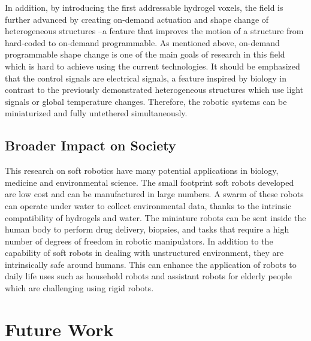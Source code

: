 In addition, by introducing the first addressable hydrogel voxels,  the field is further advanced by creating on-demand actuation and shape change of heterogeneous structures --a feature that improves the motion of a structure from hard-coded to on-demand programmable. As mentioned above, on-demand programmable shape change is one of the main goals of research in this field which is hard to achieve using the current technologies. It should be emphasized that the control signals are electrical signals, a feature inspired by biology in contrast to the previously demonstrated heterogeneous structures which use light signals or global temperature changes. Therefore, the robotic systems can be miniaturized and fully untethered simultaneously.
\subsection{Broader Impact on Society}
This research on soft robotics have many potential applications in biology, medicine and environmental science. The small footprint soft robots developed are low cost and can be manufactured in large numbers. A swarm of these robots can operate under water to collect environmental data, thanks to the intrinsic compatibility of hydrogels and water. The miniature robots can be sent inside the human body to perform drug delivery, biopsies, and tasks that require a high number of degrees of freedom in robotic manipulators.
In addition to the capability of soft robots in dealing with unstructured environment, they are intrinsically safe around humans. This can enhance the application of robots to daily life uses such as household robots and assistant robots for elderly people which are challenging using rigid robots.
\section{Future Work}
